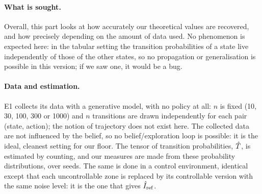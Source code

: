 \documentclass[10pt]{article}
\begin{document}
\paragraph{What is sought.}
Overall, this part looks at how accurately our theoretical values are recovered, and how precisely depending on the
amount of data used.
No phenomenon is expected here: in the tabular setting the transition probabilities of a state live independently of
those of the other states, so no propagation or generalisation is possible in this version; if we saw one, it would be a
bug.

\paragraph{Data and estimation.}
E1 collects its data with a generative model, with no policy at all: $n$ is fixed (10, 30, 100, 300 or 1000) and $n$ %
transitions are drawn independently for each pair (state, action); the notion of trajectory does not exist here.
The collected data are not influenced by the belief, so no belief/exploration loop is possible: it is the ideal,
cleanest setting for our floor.
The tensor of transition probabilities, $\hat{T}$, is estimated by counting, and our measures are made from these
probability distributions, over \eOneNSeeds{} seeds.
The same is done in a control environment, identical except that each uncontrollable zone is replaced by its
controllable version with the same noise level: it is the one that gives $\hat{I}_{\mathrm{ref}}$.
\end{document}
